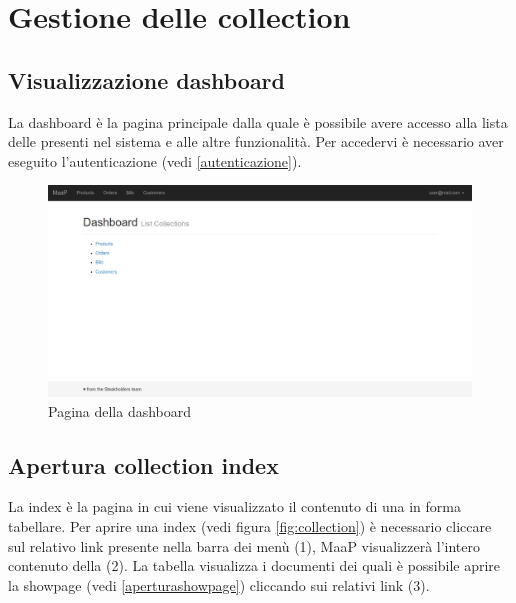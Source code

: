 \section{Gestione delle collection}

	\subsection{Visualizzazione dashboard} %
	\label{visualizzazionedashboard}
	La dashboard è la pagina principale dalla quale è possibile avere accesso alla lista delle  presenti nel sistema e alle altre funzionalità. Per accedervi è necessario aver eseguito l'autenticazione (vedi \ref{autenticazione}).

	\begin{figure}[H]
	\label{fig:dashboard}
		\centering \includegraphics[width=1\textwidth]{img/dashboard.png}
	\caption{Pagina della dashboard}
	\end{figure}
	

	\subsection{Apertura collection index} %
	\label{aperturacollectionindex}
	La  index è la pagina in cui viene visualizzato il contenuto di una  in forma tabellare. Per aprire una  index (vedi figura \ref{fig:collection}) è necessario cliccare sul relativo link presente nella barra dei menù (1), MaaP visualizzerà l'intero contenuto della  (2). La tabella visualizza i documenti dei quali è possibile aprire la showpage (vedi \ref{aperturashowpage}) cliccando sui relativi link (3). %

